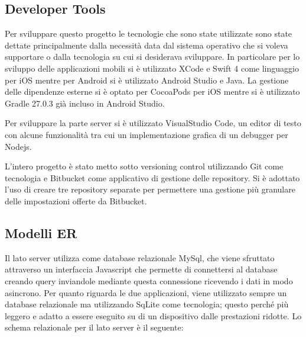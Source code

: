 	\subsection{Developer Tools}\vspace{5mm}
	
	Per sviluppare questo progetto le tecnologie che sono state utilizzate sono state dettate principalmente dalla necessità data dal sistema operativo che si voleva supportare o dalla tecnologia su cui si desiderava sviluppare. In particolare per lo sviluppo delle applicazioni mobili si è utilizzato XCode e Swift 4 come linguaggio per iOS mentre per Android si è utilizzato Android Studio e Java. La gestione delle dipendenze esterne si è optato per CocoaPods\cite{COCOA} per iOS mentre si è utilizzato Gradle 27.0.3 già incluso in Android Studio.\vspace{5mm}
	
	Per sviluppare la parte server si è utilizzato VisualStudio Code, un editor di testo con alcune funzionalità tra cui un implementazione grafica di un debugger per Nodejs.\vspace{5mm}
	
	L'intero progetto è stato metto sotto versioning control utilizzando Git come tecnologia e Bitbucket come applicativo di gestione delle repository. Si è adottato l'uso di creare tre repository separate per permettere una gestione più granulare delle impostazioni offerte da Bitbucket.
	
	\subsection{Modelli ER}\vspace{5mm}
		
	Il lato server utilizza come database relazionale MySql, che viene sfruttato attraverso un interfaccia Javascript che permette di connettersi al database  creando query inviandole mediante questa connessione ricevendo i dati in modo asincrono.
	Per quanto riguarda le due applicazioni, viene utilizzato sempre un database relazionale ma utilizzando SqLite come tecnologia; questo perché più leggero e adatto a essere eseguito su di un dispositivo dalle prestazioni ridotte.
	Lo schema relazionale per il lato server è il seguente:  \vspace{5mm}
	
